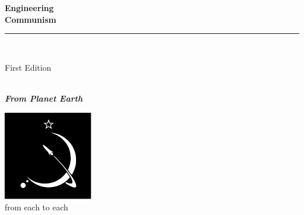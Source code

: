 \documentclass{book}
\makeatletter
\newcommand{\booksubtitle}{Engineering a Future for All}
\newcommand{\authorsubtitle}{From Planet Earth}
\newcommand{\bookauthor}{\@author}
\makeatother
\begin{document}
\begin{titlepage}
\begin{flushleft}

\textbf{\fontsize{48}{54}\selectfont Engineering\\Communism\\}

\par\noindent\rule{\textwidth}{4pt}\\


\begin{flushright}
\Large First Edition
\end{flushright}

\vspace{\fill}

\textbf{\large \bookauthor}\\[3.5pt]
\textbf{\large \textit{\authorsubtitle}}

\vspace{\fill}

\begin{center}
\includegraphics{graphics/logo.pdf}\\[4pt]
\small{from each to each}
\end{center}

\end{flushleft}
\end{titlepage}
\restoregeometry
\end{document}
